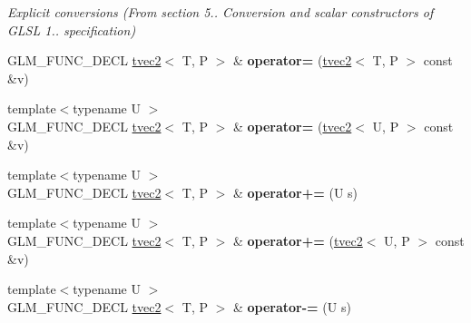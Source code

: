\begin{DoxyCompactItemize}
\begin{DoxyCompactList}\small\item\em Explicit conversions (From section 5.. Conversion and scalar constructors of G\-L\-S\-L 1.. specification) \end{DoxyCompactList}\item 
\hypertarget{structglm_1_1detail_1_1tvec2_aa28bba513156a189b4232806e7b6858e}{G\-L\-M\-\_\-\-F\-U\-N\-C\-\_\-\-D\-E\-C\-L \hyperlink{structglm_1_1detail_1_1tvec2}{tvec2}$<$ T, P $>$ \& {\bfseries operator=} (\hyperlink{structglm_1_1detail_1_1tvec2}{tvec2}$<$ T, P $>$ const \&v)}\label{structglm_1_1detail_1_1tvec2_aa28bba513156a189b4232806e7b6858e}

\item 
\hypertarget{structglm_1_1detail_1_1tvec2_ac45d730db8173a1fe3b738bf4ac07fb3}{{\footnotesize template$<$typename U $>$ }\\G\-L\-M\-\_\-\-F\-U\-N\-C\-\_\-\-D\-E\-C\-L \hyperlink{structglm_1_1detail_1_1tvec2}{tvec2}$<$ T, P $>$ \& {\bfseries operator=} (\hyperlink{structglm_1_1detail_1_1tvec2}{tvec2}$<$ U, P $>$ const \&v)}\label{structglm_1_1detail_1_1tvec2_ac45d730db8173a1fe3b738bf4ac07fb3}

\item 
\hypertarget{structglm_1_1detail_1_1tvec2_ada190d862b2574a8d77b0d795d0af619}{{\footnotesize template$<$typename U $>$ }\\G\-L\-M\-\_\-\-F\-U\-N\-C\-\_\-\-D\-E\-C\-L \hyperlink{structglm_1_1detail_1_1tvec2}{tvec2}$<$ T, P $>$ \& {\bfseries operator+=} (U s)}\label{structglm_1_1detail_1_1tvec2_ada190d862b2574a8d77b0d795d0af619}

\item 
\hypertarget{structglm_1_1detail_1_1tvec2_a5bf9b1beecee7857fa22de1c8600e619}{{\footnotesize template$<$typename U $>$ }\\G\-L\-M\-\_\-\-F\-U\-N\-C\-\_\-\-D\-E\-C\-L \hyperlink{structglm_1_1detail_1_1tvec2}{tvec2}$<$ T, P $>$ \& {\bfseries operator+=} (\hyperlink{structglm_1_1detail_1_1tvec2}{tvec2}$<$ U, P $>$ const \&v)}\label{structglm_1_1detail_1_1tvec2_a5bf9b1beecee7857fa22de1c8600e619}

\item 
\hypertarget{structglm_1_1detail_1_1tvec2_a790ae20229848462d697e3cd2247cb6d}{{\footnotesize template$<$typename U $>$ }\\G\-L\-M\-\_\-\-F\-U\-N\-C\-\_\-\-D\-E\-C\-L \hyperlink{structglm_1_1detail_1_1tvec2}{tvec2}$<$ T, P $>$ \& {\bfseries operator-\/=} (U s)}\label{structglm_1_1detail_1_1tvec2_a790ae20229848462d697e3cd2247cb6d}


\end{DoxyCompactItemize}
